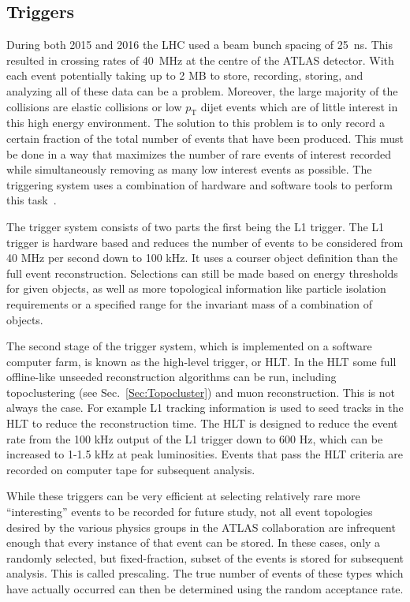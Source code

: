 \subsection{Triggers}
\label{Trig}
During both 2015 and 2016 the LHC used a beam bunch spacing of 25~ns.  
This resulted in crossing rates of 40~MHz at the centre of the ATLAS detector.  
With each event potentially taking up to 2 MB to store, recording, storing, and analyzing all of these data can be a problem.  
Moreover, the large majority of the collisions are elastic collisions or low $p_{\mathrm T}$ dijet events which are of little interest in this high energy environment.  
The solution to this problem is to only record a certain fraction of the total number of events that have been produced.  
This must be done in a way that maximizes the number of rare events of interest recorded while simultaneously removing as many low interest events as possible.  
The triggering system uses a combination of hardware and software tools to perform this task~\cite{Run2Triggers}.  

The trigger system consists of two parts the first being the \gls{L1} trigger.  
The L1 trigger is hardware based and reduces the number of events to be considered from 40 MHz per second down to 100 kHz.  
It uses a courser object definition than the full event reconstruction.  
Selections can still be made based on energy thresholds for given objects, as well as more topological information like particle isolation requirements or a specified range for the invariant mass of a combination of objects.  

The second stage of the trigger system, which is implemented on a software computer farm, is known as the high-level trigger, or HLT.  
In the HLT some full offline-like unseeded reconstruction algorithms can be run, including topoclustering (see Sec.~\ref{Sec:Topocluster}) and muon reconstruction.  
This is not always the case.  
For example L1 tracking information is used to seed tracks in the HLT to reduce the reconstruction time.  
The HLT is designed to reduce the event rate from the 100 kHz output of the L1 trigger down to 600 Hz, which can be increased to 1-1.5 kHz at peak luminosities.  
Events that pass the HLT criteria are recorded on computer tape for subsequent analysis.   

While these triggers can be very efficient at selecting relatively rare more ``interesting'' events to be recorded for future study, not all event topologies desired by the various physics groups in the ATLAS collaboration are infrequent enough that every instance of that event can be stored.  
In these cases, only a randomly selected, but fixed-fraction, subset of the events is stored for subsequent analysis.  
This is called prescaling.  
The true number of events of these types which have actually occurred can then be determined using the random acceptance rate.  
 
 
 





